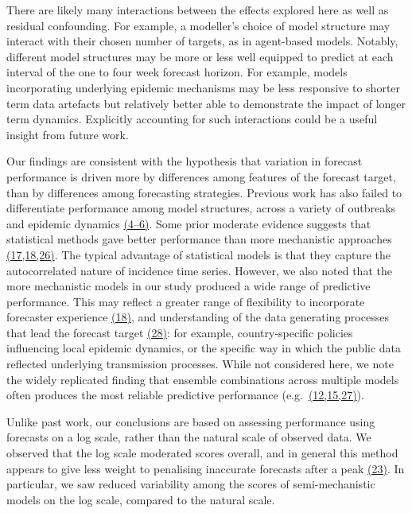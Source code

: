\documentclass[
  letterpaper,
  DIV=11,
  numbers=noendperiod]{scrartcl}
\begin{document}
There are likely many interactions between the effects explored here as
well as residual confounding. For example, a modeller's choice of model
structure may interact with their chosen number of targets, as in
agent-based models. Notably, different model structures may be more or
less well equipped to predict at each interval of the one to four week
forecast horizon. For example, models incorporating underlying epidemic
mechanisms may be less responsive to shorter term data artefacts but
relatively better able to demonstrate the impact of longer term
dynamics. Explicitly accounting for such interactions could be a useful
insight from future work.

Our findings are consistent with the hypothesis that variation in
forecast performance is driven more by differences among features of the
forecast target, than by differences among forecasting strategies.
Previous work has also failed to differentiate performance among model
structures, across a variety of outbreaks and epidemic dynamics
\href{https://www.zotero.org/google-docs/?4Vrj6C}{(4--6)}. Some prior
moderate evidence suggests that statistical methods gave better
performance than more mechanistic approaches
\href{https://www.zotero.org/google-docs/?pn8kMa}{(17,18,26)}. The
typical advantage of statistical models is that they capture the
autocorrelated nature of incidence time series. However, we also noted
that the more mechanistic models in our study produced a wide range of
predictive performance. This may reflect a greater range of flexibility
to incorporate forecaster experience
\href{https://www.zotero.org/google-docs/?tYe1Rg}{(18)}, and
understanding of the data generating processes that lead the forecast
target \href{https://www.zotero.org/google-docs/?2rqVL1}{(28)}: for
example, country-specific policies influencing local epidemic dynamics,
or the specific way in which the public data reflected underlying
transmission processes. While not considered here, we note the widely
replicated finding that ensemble combinations across multiple models
often produces the most reliable predictive performance
(e.g.~\href{https://www.zotero.org/google-docs/?EMHzzA}{(12,15,27)}).

Unlike past work, our conclusions are based on assessing performance
using forecasts on a log scale, rather than the natural scale of
observed data. We observed that the log scale moderated scores overall,
and in general this method appears to give less weight to penalising
inaccurate forecasts after a peak
\href{https://www.zotero.org/google-docs/?bNboAJ}{(23)}. In particular,
we saw reduced variability among the scores of semi-mechanistic models
on the log scale, compared to the natural scale.
\end{document}
